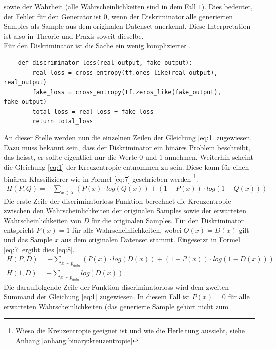 sowie der Wahrheit (alle Wahrscheinlichkeiten sind in dem Fall $1$). Dies bedeutet, der Fehler für den Generator ist $0$, wenn der Diskriminator
alle generierten Samples als Sample aus dem originalen Datenset anerkennt. Diese Interpretation ist also in Theorie und Praxis soweit dieselbe.\\
Für den Diskriminator ist die Sache ein wenig komplizierter \cite{tensorflow:1:gan}.
\begin{lstlisting}
    def discriminator_loss(real_output, fake_output):
        real_loss = cross_entropy(tf.ones_like(real_output), real_output)
        fake_loss = cross_entropy(tf.zeros_like(fake_output), fake_output)
        total_loss = real_loss + fake_loss
        return total_loss
\end{lstlisting}
An dieser Stelle werden nun die einzelnen Zeilen der Gleichung \ref{eq:1} zugewiesen. Dazu muss bekannt sein, dass der
Diskriminator ein binäres Problem beschreibt, das heisst, er sollte eigentlich nur die Werte $0$ und $1$ annehmen.
Weiterhin scheint die Gleichung \ref{eq:1} der Kreuzentropie entnommen zu sein. Diese
kann für einen binären Klassifizierer wie in Formel \ref{eq:7} geschrieben werden \cite{stackoverflow:1:crossEntropy}
\footnote{Wieso die Kreuzentropie geeignet ist und wie die Herleitung aussieht, siehe Anhang \ref{anhang:binary:kreuzentropie}}.
\begin{align}
    H(P,Q) = - \sum_{x \in X} (P(x) \cdot log(Q(x)) + (1 - P(x)) \cdot log(1 - Q(x))) \label{eq:7}
\end{align}
Die erste Zeile der \glqq discriminator\textunderscore loss\grqq{} Funktion berechnet die Kreuzentropie zwischen den Wahrscheinlichkeiten der originalen Samples
sowie der erwarteten Wahrscheinlichkeiten von $D$ für die originalen Samples. Für den Diskriminator entspricht $P(x) = 1$ für alle Wahrscheinlichkeiten,
wobei $Q(x) = D(x)$ gilt und das Sample $x$ aus dem originalen Datenset stammt. Eingesetzt in Formel \ref{eq:7} ergibt dies \ref{eq:8}.
\begin{align}
    H(P,D) = - \sum_{x \sim p_{data}} (P(x) \cdot log(D(x)) + (1 - P(x)) \cdot log(1 - D(x))) \label{eq:8}\\
    H(1,D) = - \sum_{x \sim p_{data}} log(D(x)) \label{eq:11}
\end{align}
Die darauffolgende Zeile der Funktion \glqq discriminator\textunderscore loss\grqq{} wird dem zweiten Summand der Gleichung \ref{eq:1} zugewiesen.
In diesem Fall ist $P(x) = 0$ für alle erwarteten Wahrscheinlichkeiten (das generierte Sample gehört nicht zum
